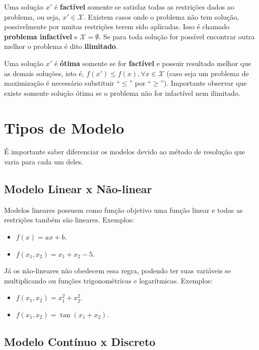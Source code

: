 Uma solução $x'$ é \textbf{factível} somente se satisfaz todas as restrições dados ao problema, ou seja, $x' \in \mathcal{X}$.
Existem casos onde o problema não tem solução, possivelmente por muitas restrições terem sido aplicadas.
Isso é chamado \textbf{problema infactível} e $\mathcal{X} = \emptyset$.
Se para toda solução for possível encontrar outra melhor o problema é dito \textbf{ilimitado}.

Uma solução $x'$ é \textbf{ótima} somente se for \textbf{factível} e possuir resultado melhor que as demais soluções, isto é, $f(x') \le f(x), \forall x \in \mathcal{X}$ (caso seja um problema de maximização é necessário substituir “$\le$” por “$\ge$”).
Importante observar que existe somente solução ótima se o problema não for infactível nem ilimitado.


\section{Tipos de Modelo}\label{sec:tipos-de-modelo}

É importante saber diferenciar os modelos devido ao método de resolução que varia para cada um deles.

\subsection{Modelo Linear x Não-linear}\label{subsec:modelo-linear}


Modelos lineares possuem como função objetivo uma função linear e todas as restrições também são lineares.
Exemplos:

\begin{itemize}
    \item $f(x) = ax + b$.
    \item $f(x_1, x_2) = x_1 + x_2 - 5$.
\end{itemize}

Já os não-lineares não obedecem essa regra, podendo ter suas variáveis se multiplicando ou funções trigonométricas e logarítmicas.
Exemplos:

\begin{itemize}
    \item $f(x_1, x_2) = x_1^2 + x_2^2$.
    \item $f(x_1, x_2) = \tan(x_1 + x_2)$.
\end{itemize}

\subsection{Modelo Contínuo x Discreto}\label{subsec:modelo-continuo-x-discreto}

